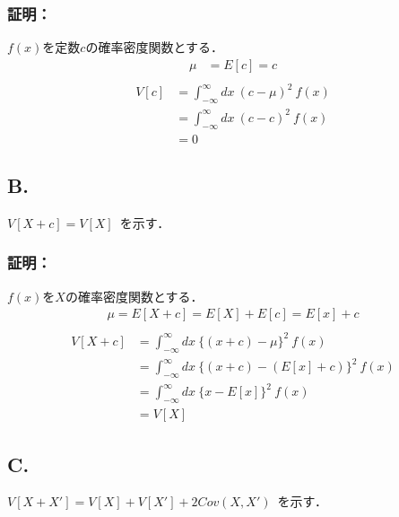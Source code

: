 \documentclass[fleqn]{jsarticle}
\begin{document}
  \subsubsection*{証明：}
    \noindent $f(x)$を定数$c$の確率密度関数とする．
    \begin{equation*}
      \begin{aligned}
        \mu &= E[c] = c\\
      \end{aligned}
    \end{equation*}
    \begin{equation*}
      \begin{aligned}
        V[c] &= \int_{-\infty}^{\infty} dx\ (c - \mu)^2\ f(x)\\
        &= \int_{-\infty}^{\infty} dx\ (c - c)^2\ f(x)\\
        &= 0
      \end{aligned}
    \end{equation*}

\subsection*{B.}
  $V[X+c] = V[X]$\ を示す．

  \subsubsection*{証明：}
    \noindent $f(x)$を$X$の確率密度関数とする．
    \begin{equation*}
      \begin{aligned}
        \mu = E[X+c] = E[X] + E[c] = E[x] + c\\
      \end{aligned}
    \end{equation*}
    \begin{equation*}
      \begin{aligned}
        V[X+c] &= \int_{-\infty}^{\infty} dx\ \{(x+c) - \mu\}^2\ f(x)\\
        &= \int_{-\infty}^{\infty} dx\ \{(x+c) - (E[x]+c)\}^2\ f(x)\\
        &= \int_{-\infty}^{\infty} dx\ \{x - E[x]\}^2\ f(x)\\
        &= V[X]
      \end{aligned}
    \end{equation*}

\subsection*{C.}
  $V[X+X'] = V[X] + V[X'] + 2Cov(X, X')$\ を示す．
\end{document}
